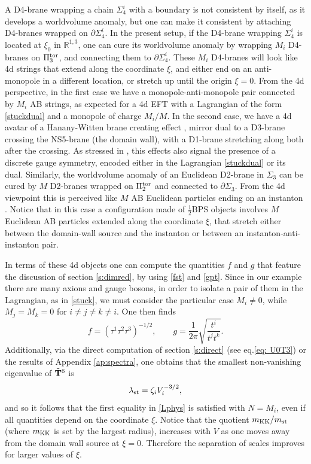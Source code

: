 \documentclass[11pt]{article}
\def\be{\begin{equation}}
\def\ee{\end{equation}}
\def\oh{\frac{1}{2}}
\def\p {{\partial}}
\newcommand{\IR}{\mathbb{R}}
\begin{document}
A D4-brane wrapping a chain $\Sigma_4^i$ with a boundary is not consistent by itself, as it develops a worldvolume anomaly, but one can make it consistent by attaching D4-branes wrapped on $\p \Sigma_4^i$. In the present setup, if the D4-brane wrapping $\Sigma_4^i$ is located at $\xi_0$ in $\IR^{1,3}$, one can cure its worldvolume anomaly by wrapping $M_i$ D4-branes on $\Pi_3^{\rm tor}$, and connecting them to $\p \Sigma_4^i$. These $M_i$ D4-branes will look like 4d strings that extend along the coordinate $\xi$, and either end on an anti-monopole in a different location, or stretch up until the origin $\xi=0$. From the 4d perspective, in the first case we have a monopole-anti-monopole pair connected by $M_i$ AB strings, as expected for a 4d EFT with a Lagrangian of the form \eqref{stuckdual} and a monopole of charge $M_i/M$. In the second case, we have a 4d avatar of a Hanany-Witten brane creating effect \cite{Hanany:1996ie}, mirror dual to a D3-brane crossing the NS5-brane (the domain wall), with a D1-brane stretching along both after the crossing. As stressed in \cite{Berasaluce-Gonzalez:2012awn}, this effects also signal the presence of a discrete gauge symmetry, encoded either in the Lagrangian \eqref{stuckdual} or its dual. Similarly, the worldvolume anomaly of an Euclidean D2-brane in $\Sigma_3$ can be cured by $M$ D2-branes wrapped on $\Pi_2^{\rm tor}$ and connected to $\p \Sigma_3$. From the 4d viewpoint this is perceived like $M$ AB Euclidean particles ending on an instanton \cite{Banks:2010zn}. Notice that in this case a configuration made of $\oh$BPS objects involves $M$ Euclidean AB particles extended along the coordinate $\xi$, that stretch either between the domain-wall source and the instanton or between an instanton-anti-instanton pair.

In terms of these 4d objects one can compute the quantities $f$ and $g$ that feature the discussion of section \ref{s:dimred}, by using \eqref{fst} and \eqref{gpt}. Since in our example there are many axions and gauge bosons, in order to isolate a pair of them in the Lagrangian, as in \eqref{stuck}, we must consider the particular case $M_i \neq 0$, while $M_j = M_k =0$ for $i\neq j \neq k \neq i$. One then finds 
\be
f = \left( \tau^1\tau^2 \tau^3 \right)^{-1/2} , \qquad g = \frac{1}{2\pi} \sqrt{\frac{t^i} {t^j t^k }} .
\label{fandg}
\ee
Additionally, via the direct computation of section \ref{s:direct} (see eq.\eqref{eq: U0T3}) or the results of Appendix \ref{ap:spectra}, one obtains that the smallest non-vanishing eigenvalue of $\tilde{\bf T}^6$ is
\be
\lambda_{\rm st} =  \zeta_i V_i^{-3/2} ,
\label{lamstex}
\ee
and so it follows that the first equality in \eqref{Lphys} is satisfied with $N=M_i$, even if all quantities depend on the coordinate $\xi$. Notice that the quotient $m_{\rm KK}/m_{\rm st}$ (where $m_{\rm KK}$ is set by the largest radius), increases with $V$ as one moves away from the domain wall source at $\xi=0$. Therefore the separation of scales improves for larger values of $\xi$. 
\end{document}
